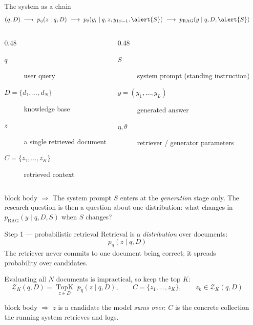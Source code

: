 \documentclass[11pt,aspectratio=169]{beamer}
\newcommand{\takeaway}[1]{%
  \vfill
  \begin{beamercolorbox}[wd=\textwidth,sep=5pt,rounded=true]{block body}%
    \small\textbf{$\Rightarrow$} #1
  \end{beamercolorbox}}
\begin{document}
\begin{frame}{The system as a chain}
  \[
    (q,D) \;\longrightarrow\; p_\eta(z \mid q,D)
          \;\longrightarrow\; p_\theta(y_i \mid q,z,y_{1:i-1},\alert{S})
          \;\longrightarrow\; p_{\mathrm{RAG}}(y \mid q,D,\alert{S})
  \]
  \vspace{-0.5em}
  \begin{columns}[T]
    \begin{column}{0.48\textwidth}
      \small
      \begin{description}
        \item[$q$] user query
        \item[$D=\{d_1,\dots,d_N\}$] knowledge base
        \item[$z$] a single retrieved document
        \item[$C=\{z_1,\dots,z_K\}$] retrieved context
      \end{description}
    \end{column}
    \begin{column}{0.48\textwidth}
      \small
      \begin{description}
        \item[$S$] system prompt (standing instruction)
        \item[$y=(y_1,\dots,y_L)$] generated answer
        \item[$\eta,\theta$] retriever / generator parameters
      \end{description}
    \end{column}
  \end{columns}
  \takeaway{The system prompt $S$ enters at the \emph{generation} stage only.
  The research question is then a question about one distribution: what
  changes in $p_{\mathrm{RAG}}(y\mid q,D,S)$ when $S$ changes?}
\end{frame}

\begin{frame}{Step 1 --- probabilistic retrieval}
  Retrieval is a \emph{distribution} over documents:
  \begin{equation*}
    p_\eta(z \mid q,D)
  \end{equation*}
  The retriever never commits to one document being correct; it spreads
  probability over candidates.
  \medskip

  Evaluating all $N$ documents is impractical, so keep the top $K$:
  \begin{equation*}
    \mathcal{Z}_K(q,D) = \operatorname*{TopK}_{z \in D} \; p_\eta(z \mid q,D),
    \qquad
    C = \{z_1,\ldots,z_K\}, \qquad z_k \in \mathcal{Z}_K(q,D)
  \end{equation*}
  \takeaway{$z$ is a candidate the model \emph{sums over}; $C$ is the concrete
  collection the running system retrieves and logs.}
\end{frame}
\end{document}
